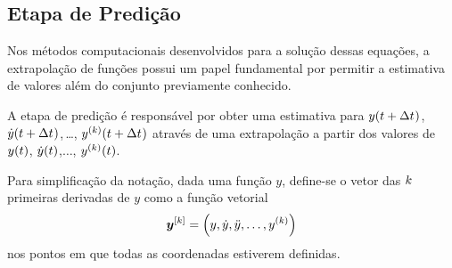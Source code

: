 \subsection{Etapa de Predição} \label{subsec:prediction}

Nos métodos computacionais desenvolvidos para a solução dessas equações, a extrapolação de funções possui um papel fundamental por permitir a estimativa de valores além do conjunto previamente conhecido.

A etapa de predição é responsável por obter uma estimativa para \(y\pqty{t+\Dt}\), \(\deriv{1}{y}\pqty{t+\Dt}\),\,\dots, \(\deriv{\taylorOrder}{y}\pqty{t+\Dt}\) através de uma extrapolação a partir dos valores de \(y\pqty{t}\), \(\deriv{1}{y}\pqty{t}\),\(\dotsc\), \(\deriv{\taylorOrder}{y}\pqty{t}\).

Para simplificação da notação, dada uma função \(y\), define-se o vetor das \(k\) primeiras derivadas de \(y\) como a função vetorial
\begin{equation*}
	\drvvec{\taylorOrder}{y} = \pqty{y, \deriv{1}{y}, \deriv{2}{y}, \dotsc, \deriv{\taylorOrder}{y}}
\end{equation*}
nos pontos em que todas as coordenadas estiverem definidas.

